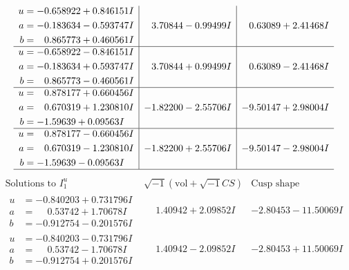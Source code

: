 \documentclass[1p]{elsarticle_modified}
\theoremstyle{definition}
\newcommand{\I}{\sqrt{-1}}
\begin{document}
$$\begin{array}{c|c|c}
\begin{aligned}
u &= -0.658922 + 0.846151 I \\
a &= -0.183634 - 0.593747 I \\
b &= \phantom{-}0.865773 + 0.460561 I\end{aligned}
 & \phantom{-}3.70844 - 0.99499 I & \phantom{-}0.63089 + 2.41468 I \\ \hline\begin{aligned}
u &= -0.658922 - 0.846151 I \\
a &= -0.183634 + 0.593747 I \\
b &= \phantom{-}0.865773 - 0.460561 I\end{aligned}
 & \phantom{-}3.70844 + 0.99499 I & \phantom{-}0.63089 - 2.41468 I \\ \hline\begin{aligned}
u &= \phantom{-}0.878177 + 0.660456 I \\
a &= \phantom{-}0.670319 + 1.230810 I \\
b &= -1.59639 + 0.09563 I\end{aligned}
 & -1.82200 - 2.55706 I & -9.50147 + 2.98004 I \\ \hline\begin{aligned}
u &= \phantom{-}0.878177 - 0.660456 I \\
a &= \phantom{-}0.670319 - 1.230810 I \\
b &= -1.59639 - 0.09563 I\end{aligned}
 & -1.82200 + 2.55706 I & -9.50147 - 2.98004 I\\
 \hline 
 \end{array}$$\newpage$$\begin{array}{c|c|c}  
\text{Solutions to }I^u_{1}& \I (\text{vol} + \sqrt{-1}CS) & \text{Cusp shape}\\
 \hline 
\begin{aligned}
u &= -0.840203 + 0.731796 I \\
a &= \phantom{-}0.53742 + 1.70678 I \\
b &= -0.912754 - 0.201576 I\end{aligned}
 & \phantom{-}1.40942 + 2.09852 I & -2.80453 - 11.50069 I \\ \hline\begin{aligned}
u &= -0.840203 - 0.731796 I \\
a &= \phantom{-}0.53742 - 1.70678 I \\
b &= -0.912754 + 0.201576 I\end{aligned}
 & \phantom{-}1.40942 - 2.09852 I & -2.80453 + 11.50069 I \\ \hline\begin{aligned}

\end{aligned}
\end{array}$$
\end{document}
